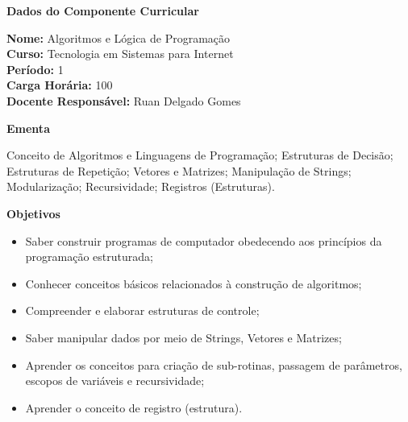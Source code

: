 
\begin{snugshade}\begin{center}\textbf{
    Dados do Componente Curricular
}\end{center}\end{snugshade}

\noindent \textbf{Nome:}                Algoritmos e L\'ogica de Programa\c{c}\~ao
\\        \textbf{Curso:}               Tecnologia em Sistemas para Internet
\\        \textbf{Período:}             \unit{1}{\degree}
\\        \textbf{Carga Horária:}       \unit{100}{\hour}
\\        \textbf{Docente Responsável:} Ruan Delgado Gomes


\begin{snugshade}\begin{center}\textbf{
    Ementa
\vphantom{q}}\end{center}\end{snugshade}

\noindent
Conceito de Algoritmos e Linguagens de Programação; Estruturas de Decisão; Estruturas de Repetição; Vetores e Matrizes; Manipulação de Strings; Modularização; Recursividade; Registros (Estruturas).

\begin{snugshade}\begin{center}\textbf{
    Objetivos
}\end{center}\end{snugshade}

\begin{itemize}

\item Saber construir programas de computador obedecendo aos princípios da programação estruturada;
\item Conhecer conceitos básicos relacionados à construção de algoritmos;
\item Compreender e elaborar estruturas de controle;
\item Saber manipular dados por meio de Strings, Vetores e Matrizes;
\item Aprender os conceitos para criação de sub-rotinas, passagem de parâmetros, escopos de variáveis e recursividade;
\item Aprender o conceito de registro (estrutura).

\end{itemize} 

